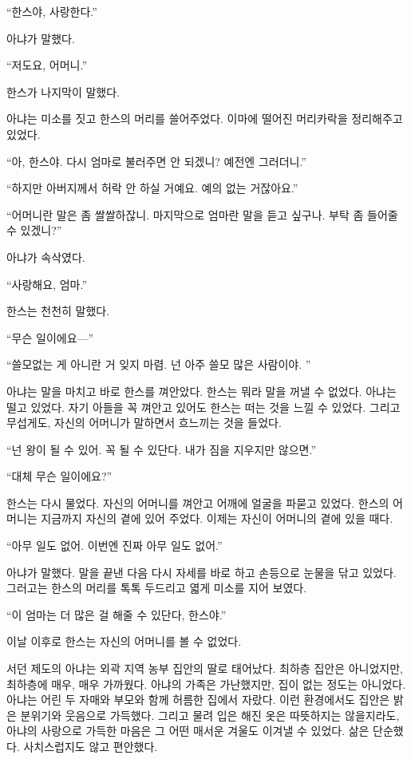 ``한스야, 사랑한다.''

아냐가 말했다.

``저도요, 어머니.''

한스가 나지막이 말했다.

아냐는 미소를 짓고 한스의 머리를 쓸어주었다. 이마에 떨어진 머리카락을 정리해주고 있었다.

``아, 한스야. 다시 엄마로 불러주면 안 되겠니? 예전엔 그러더니.''

``하지만 아버지께서 허락 안 하실 거예요. 예의 없는 거잖아요.''

``어머니란 말은 좀 쌀쌀하잖니. 마지막으로 엄마란 말을 듣고 싶구나. 부탁 좀 들어줄 수 있겠니?''

아냐가 속삭였다.

``사랑해요, 엄마.''

한스는 천천히 말했다.

``무슨 일이에요—''

``쓸모없는 게 아니란 거 잊지 마렴. 넌 아주 쓸모 많은 사람이야. ''

아냐는 말을 마치고 바로 한스를 껴안았다. 한스는 뭐라 말을 꺼낼 수 없었다. 아냐는 떨고 있었다. 자기 아들을 꼭 껴안고 있어도 한스는 떠는 것을 느낄 수 있었다. 그리고 무섭게도, 자신의 어머니가 말하면서 흐느끼는 것을 들었다.

``넌 왕이 될 수 있어. 꼭 될 수 있단다. 내가 짐을 지우지만 않으면.''

``대체 무슨 일이에요?''

한스는 다시 물었다. 자신의 어머니를 껴안고 어깨에 얼굴을 파묻고 있었다. 한스의 어머니는 지금까지 자신의 곁에 있어 주었다. 이제는 자신이 어머니의 곁에 있을 때다.

``아무 일도 없어. 이번엔 진짜 아무 일도 없어.''

아냐가 말했다. 말을 끝낸 다음 다시 자세를 바로 하고 손등으로 눈물을 닦고 있었다. 그러고는 한스의 머리를 톡톡 두드리고 엷게 미소를 지어 보였다.

``이 엄마는 더 많은 걸 해줄 수 있단다, 한스야.''

이날 이후로 한스는 자신의 어머니를 볼 수 없었다.

\textbreak

서던 제도의 아냐는 외곽 지역 농부 집안의 딸로 태어났다. 최하층 집안은 아니었지만, 최하층에 매우, 매우 가까웠다. 아냐의 가족은 가난했지만, 집이 없는 정도는 아니었다. 아냐는 어린 두 자매와 부모와 함께 허름한 집에서 자랐다. 이런 환경에서도 집안은 밝은 분위기와 웃음으로 가득했다. 그리고 물려 입은 해진 옷은 따뜻하지는 않을지라도, 아냐의 사랑으로 가득한 마음은 그 어떤 매서운 겨울도 이겨낼 수 있었다. 삶은 단순했다. 사치스럽지도 않고 편안했다.


